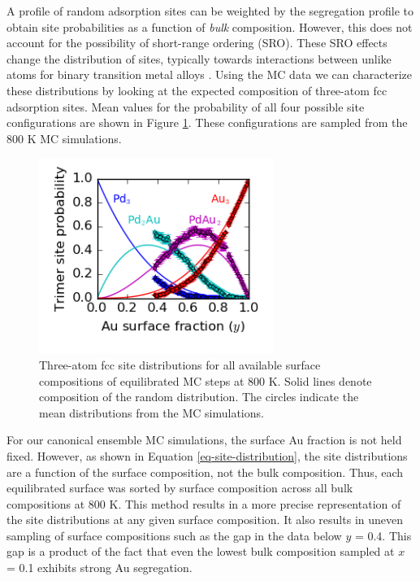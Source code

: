 \documentclass[12pt]{cmuthesis}
\begin{document}
A profile of random adsorption sites can be weighted by the segregation profile to obtain site probabilities as a function of \emph{bulk} composition. However, this does not account for the possibility of short-range ordering (SRO). These SRO effects change the distribution of sites, typically towards interactions between unlike atoms for binary transition metal alloys \cite{sadigh-1999-short-range,engstfeld-2012-format-atomic}. Using the MC data we can characterize these distributions by looking at the expected composition of three-atom fcc adsorption sites. Mean values for the probability of all four possible site configurations are shown in Figure \ref{fig-site-distribution}. These configurations are sampled from the 800 K MC simulations.

\begin{figure}[h]
\centering
\includegraphics[width=3in]{./images/site-distribution.png}
\caption{\label{fig-site-distribution}
Three-atom fcc site distributions for all available surface compositions of equilibrated MC steps at 800 K. Solid lines denote composition of the random distribution. The circles indicate the mean distributions from the MC simulations.}
\end{figure}

For our canonical ensemble MC simulations, the surface Au fraction is not held fixed. However, as shown in Equation \ref{eq-site-distribution}, the site distributions are a function of the surface composition, not the bulk composition. Thus, each equilibrated surface was sorted by surface composition across all bulk compositions at 800 K. This method results in a more precise representation of the site distributions at any given surface composition. It also results in uneven sampling of surface compositions such as the gap in the data below \(y\) = 0.4. This gap is a product of the fact that even the lowest bulk composition sampled at \(x\) = 0.1 exhibits strong Au segregation.
\end{document}
